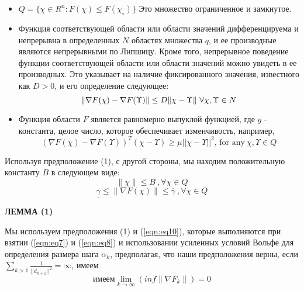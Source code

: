 \begin{itemize}
    \item $Q=\{\chi\in R^{n}\colon F(\chi)\leq F(\chi_{\circ})\}$ Это
    множество ограниченное и замкнутое.
    \item Функция соответствующей области или области значений дифференцируема и
    непрерывна в определенных $N$ областях множества $q$, и ее производные
    являются непрерывными по Липшицу. Кроме того, непрерывное поведение функции
    соответствующей области или области значений можно увидеть в ее производных.
    Это указывает на наличие фиксированного значения, известного как $D > 0$, и
    его определение следующее:
    \begin{equation*}
        \|\nabla F(\chi)-{\cal \nabla}F(\Upsilon)\|\leq D\|\chi-\Upsilon\|\ \forall\chi,\Upsilon\in N
    \end{equation*}
    \item Функция области $F$ является равномерно выпуклой функцией, где $g$ -
    константа, целое число, которое обеспечивает изменчивость, например,
    \begin{equation*}
        \left(\nabla F(\chi)-\nabla F(\Upsilon)\right)^{T}(\chi-\Upsilon)\geq\mu||\chi-\Upsilon||^{2} \text{, for any} \ \chi,\Upsilon\in Q
    \end{equation*}
\end{itemize}

\noindent Используя предположение (1), с другой стороны, мы находим
положительную константу $B$ в следующем виде:
\begin{equation*}
    \|\chi\|\leq B\ ,\forall\chi\in Q
\end{equation*}
\begin{equation}\label{eqn:eq10}
    \underline{{{\gamma}}}\leq\|\nabla F(\chi)\|\leq\overline{{{\gamma}}}\ ,\forall\chi\in Q
\end{equation}

\noindent \textbf{ЛЕММА (1)}

Мы используем предположения (1) и (\ref{eqn:eq10}), которые выполняются при
взятии (\ref{eqn:eq7}) и (\ref{eqn:eq8}) и использовании усиленных условий Вольфе
для определения размера шага $\alpha_{k}$, предполагая, что наши
предположения верны, если
$\textstyle\sum_{k>1}{\frac{1}{||d_{k+1}||^{2}}}=\infty$, имеем
\begin{equation*}
    \text{имеем} \lim_{k \rightarrow \infty}\left(i n f\lVert\nabla F_{k}\rVert\right)=0
\end{equation*}

